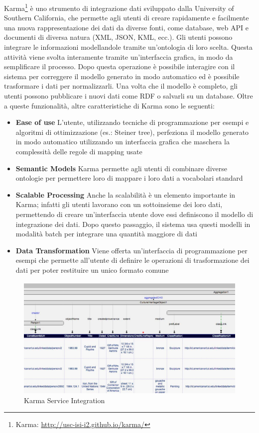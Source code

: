 Karma\footnote{Karma: \url{http://usc-isi-i2.github.io/karma/}} è uno strumento di integrazione dati sviluppato dalla University of Southern California, che permette agli utenti di creare rapidamente e facilmente una nuova rappresentazione dei dati  da diverse fonti, come database, web API e documenti di diversa natura (XML, JSON, KML, ecc.). Gli utenti possono integrare le informazioni modellandole tramite un'ontologia di loro scelta. Questa attività viene svolta interamente tramite un'interfaccia grafica, in modo da semplificare il processo. 
Dopo questa operazione è possibile interagire con il sistema per correggere il modello generato in modo automatico ed è possibile trasformare i dati per normalizzarli. Una volta che il modello è completo, gli utenti possono pubblicare i nuovi dati come RDF o salvarli su un database.
Oltre a queste funzionalità, altre caratteristiche di Karma sono le seguenti:

\begin{itemize}
	\item \textbf{Ease of use}
	L'utente, utilizzando tecniche di programmazione per esempi e algoritmi  di ottimizzazione (es.: Steiner tree), perfeziona il modello generato in modo automatico utilizzando un interfaccia grafica che maschera la complessità delle regole di mapping usate
	\item \textbf{Semantic Models}
	Karma permette agli utenti di combinare diverse ontologie per permettere loro di mappare i loro dati a vocabolari standard
	\item \textbf{Scalable Processing}
	Anche la scalabilità è un elemento importante in Karma; infatti gli utenti lavorano con un sottoinsieme dei loro dati, permettendo di creare un'interfaccia utente dove essi definiscono il modello di integrazione dei dati. Dopo questo passaggio, il sistema usa questi modelli in modalità batch per integrare una quantità maggiore di dati
	\item \textbf{Data Transformation}
	Viene offerta un'interfaccia di programmazione per esempi che permette all'utente di definire le operazioni di trasformazione dei dati per poter restituire un unico formato comune
\end{itemize}

\begin{figure}[ht]
	\centering
	\includegraphics[width=\textwidth]{2-preliminari/Immagini/karma-europeana.jpg}
	\caption{Karma Service Integration}\label{fig:karma-europeana}
\end{figure}

